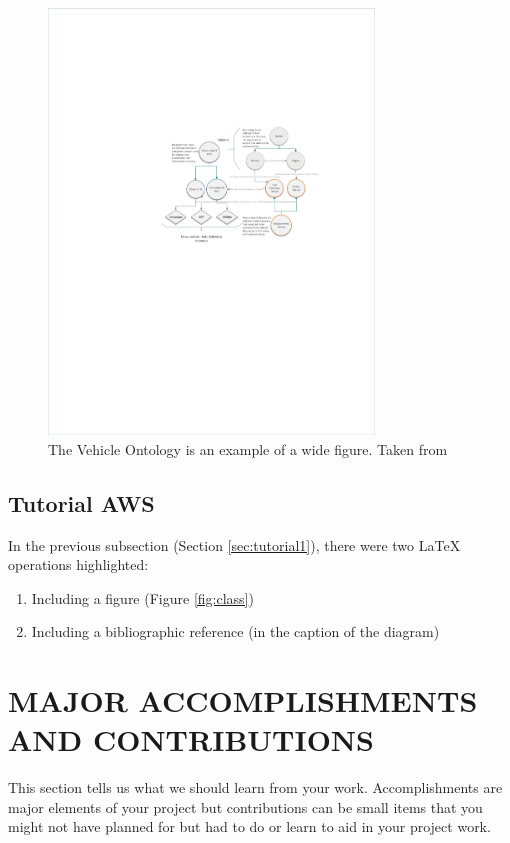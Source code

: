\documentclass[a4paper,twoside]{article}
\begin{document}
\begin{figure}[ht]
        \centering
        \caption{The Vehicle Ontology is an example of a wide figure. Taken from \cite{Cummings2017}}
        \label{fig:vehicles}
        \includegraphics[height=4.45in]{Images/VehiclesExample}
\end{figure}

\subsection{Tutorial AWS}
\label{sec:aws}

\noindent In the previous subsection (Section \ref{sec:tutorial1}), there were two LaTeX operations highlighted:
   \begin{enumerate}
   \item Including a figure (Figure \ref{fig:class})
   \item Including a bibliographic reference (in the caption of the diagram)
   \end{enumerate}

\section{\uppercase{Major Accomplishments and Contributions}}
\label{sec:accomplishments}

\noindent This section tells us what we should learn from your work.  Accomplishments are major elements of your project but contributions can be small items that you might not have planned for but had to do or learn to aid in your project work.
\end{document}
